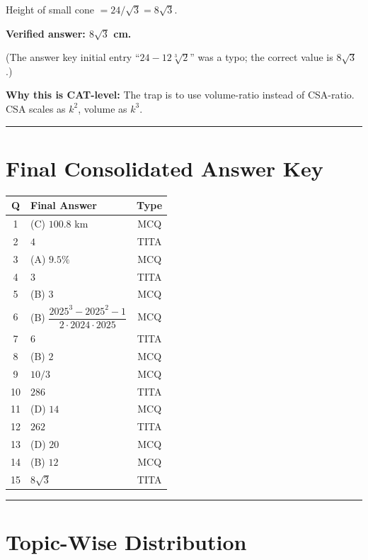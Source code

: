 \documentclass[11pt,a4paper]{article}
\begin{document}
Height of small cone $= 24/\sqrt{3} = 8\sqrt{3}$.

\textbf{Verified answer: $8\sqrt{3}$ cm.}

(The answer key initial entry ``$24 - 12\sqrt[3]{2}$'' was a typo; the correct value is $8\sqrt{3}$.)

\textbf{Why this is CAT-level:} The trap is to use volume-ratio instead of CSA-ratio. CSA scales as $k^2$, volume as $k^3$.

\vspace{0.7em}
\hrule
\vspace{0.5em}

\section*{Final Consolidated Answer Key}

\begin{center}
\begin{tabular}{|c|l|c|}
\hline
\textbf{Q} & \textbf{Final Answer} & \textbf{Type} \\
\hline
1 & (C) $100.8$ km & MCQ \\
2 & $4$ & TITA \\
3 & (A) $9.5\%$ & MCQ \\
4 & $3$ & TITA \\
5 & (B) $3$ & MCQ \\
6 & (B) $\dfrac{2025^3 - 2025^2 - 1}{2 \cdot 2024 \cdot 2025}$ & MCQ \\
7 & $6$ & TITA \\
8 & (B) $2$ & MCQ \\
9 & $10/3$ & MCQ \\
10 & $286$ & TITA \\
11 & (D) $14$ & MCQ \\
12 & $262$ & TITA \\
13 & (D) $20$ & MCQ \\
14 & (B) $12$ & MCQ \\
15 & $8\sqrt{3}$ & TITA \\
\hline
\end{tabular}
\end{center}

\vspace{0.5em}
\hrule
\vspace{0.5em}

\section*{Topic-Wise Distribution}
\end{document}
